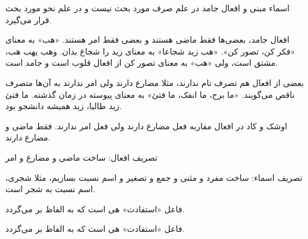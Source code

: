 \documentclass{article}
\begin{document}
\begin{addpage}{5}
  \vspace*{3cm}
  \begin{note}
    اسماء مبنی و افعال جامد در علم صرف مورد بحث نیست و در علم نحو مورد بحث قرار می‌گیرد.
  \end{note}
  \begin{note}
    افعال جامد، بعضی‌ها فقط ماضی هستند و بعضی فقط امر هستند. «هب» به معنای «فکر کن، تصور کن». «هب زید شجاعا» به معنای زید را شجاع بدان.
    وهب یهب هب، مشتق است، ولی «هب» به معنای تصور کن از افعال قلوب است و جامد است.
  \end{note}
  \begin{note}
    بعضی از افعال هم تصرف تام ندارند، مثلا مضارع دارند ولی امر ندارند به آن‌ها متصرف ناقص می‌گویند. «ما برح، ما انفک، ما فتئ» به معنای پیوسته در زمان گذشته.
    ما فتئ زید طالبا، زید همیشه دانشجو بود.
  \end{note}
  \begin{note}
    اوشک و کاد در افعال مقاربه فعل مضارع دارند ولی فعل امر ندارند. فقط ماضی و مضارع دارند.
  \end{note}
  \vspace*{3cm}
  \begin{note}
    تصریف افعال: ساخت ماضی و مضارع و امر
  \end{note}
  \begin{note}
    تصریف اسماء: ساخت مفرد و مثنی و جمع و تصغیر و اسم نسبت بسازیم، مثلا شجری، اسم نسبت به شجر است.
  \end{note}
  \vspace*{1.4cm}
  \begin{note}
    فاعل «استفادت» هی است که به الفاظ بر می‌گردد.
  \end{note}
\end{addpage}

\begin{addpage}{6}
  \begin{note}
    فاعل «استفادت» هی است که به الفاظ بر می‌گردد.
  \end{note}
\end{addpage}
\end{document}
